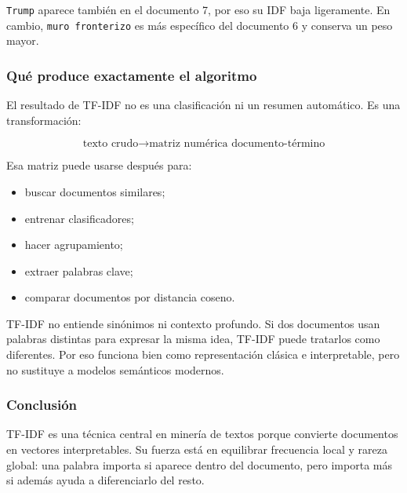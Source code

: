 \documentclass[
  spanish,
  letterpaper,
  DIV=11,
  numbers=noendperiod]{scrartcl}
\providecommand{\tightlist}{%
  \setlength{\itemsep}{0pt}\setlength{\parskip}{0pt}}
\begin{document}
\texttt{Trump} aparece también en el documento 7, por eso su IDF baja
ligeramente. En cambio, \texttt{muro\ fronterizo} es más específico del
documento 6 y conserva un peso mayor.

\subsubsection{Qué produce exactamente el
algoritmo}\label{quuxe9-produce-exactamente-el-algoritmo}

El resultado de TF-IDF no es una clasificación ni un resumen automático.
Es una transformación:

\[\text{texto crudo} \longrightarrow \text{matriz numérica documento-término}\]

Esa matriz puede usarse después para:

\begin{itemize}
\tightlist
\item
  buscar documentos similares;
\item
  entrenar clasificadores;
\item
  hacer agrupamiento;
\item
  extraer palabras clave;
\item
  comparar documentos por distancia coseno.
\end{itemize}

\begin{tcolorbox}[enhanced jigsaw, breakable, rightrule=.15mm, leftrule=.75mm, opacityback=0, arc=.35mm, colframe=quarto-callout-warning-color-frame, toprule=.15mm, left=2mm, colback=white, bottomrule=.15mm]

TF-IDF no entiende sinónimos ni contexto profundo. Si dos documentos
usan palabras distintas para expresar la misma idea, TF-IDF puede
tratarlos como diferentes. Por eso funciona bien como representación
clásica e interpretable, pero no sustituye a modelos semánticos
modernos.

\end{tcolorbox}

\subsubsection{Conclusión}\label{conclusiuxf3n}

TF-IDF es una técnica central en minería de textos porque convierte
documentos en vectores interpretables. Su fuerza está en equilibrar
frecuencia local y rareza global: una palabra importa si aparece dentro
del documento, pero importa más si además ayuda a diferenciarlo del
resto.
\end{document}
